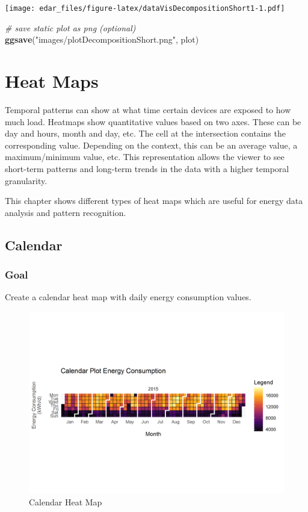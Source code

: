 \documentclass[
]{book}
\newenvironment{Shaded}{\begin{snugshade}}{\end{snugshade}}
\newcommand{\CommentTok}[1]{\textcolor[rgb]{0.56,0.35,0.01}{\textit{#1}}}
\newcommand{\KeywordTok}[1]{\textcolor[rgb]{0.13,0.29,0.53}{\textbf{#1}}}
\newcommand{\NormalTok}[1]{#1}
\newcommand{\StringTok}[1]{\textcolor[rgb]{0.31,0.60,0.02}{#1}}
\let\oldShaded\Shaded
\let\endoldShaded\endShaded
\renewenvironment{Shaded}{\footnotesize\oldShaded}{\endoldShaded}
\begin{document}
\texttt{[image: edar\_files/figure-latex/dataVisDecompositionShort1-1.pdf]}

\begin{Shaded}
\begin{Highlighting}[]
\CommentTok{# save static plot as png (optional)}
\KeywordTok{ggsave}\NormalTok{(}\StringTok{"images/plotDecompositionShort.png"}\NormalTok{, plot)}
\end{Highlighting}
\end{Shaded}

\hypertarget{heat-maps}{%
\chapter{Heat Maps}\label{heat-maps}}

Temporal patterns can show at what time certain devices are exposed to how much load. Heatmaps show quantitative values based on two axes. These can be day and hours, month and day, etc. The cell at the intersection contains the corresponding value. Depending on the context, this can be an average value, a maximum/minimum value, etc. This representation allows the viewer to see short-term patterns and long-term trends in the data with a higher temporal granularity.

This chapter shows different types of heat maps which are useful for energy data analysis and pattern recognition.

\hypertarget{calendar}{%
\section{Calendar}\label{calendar}}

\hypertarget{goal-6}{%
\subsection{Goal}\label{goal-6}}

Create a calendar heat map with daily energy consumption values.

\begin{figure}
\includegraphics[width=0.7\linewidth]{images/plotHeatMapCalendar} \caption{Calendar Heat Map}\label{fig:unnamed-chunk-15}
\end{figure}
\end{document}
